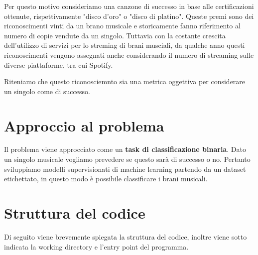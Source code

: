 Per questo motivo consideriamo una canzone di successo in base alle certificazioni ottenute, rispettivamente "disco d'oro" o "disco di platino". Queste premi sono dei riconoscimenti vinti da un brano musicale e storicamente fanno riferimento al numero di copie vendute da un singolo. Tuttavia con la costante crescita dell'utilizzo di servizi per lo streming di brani musciali, da qualche anno questi riconoscimenti vengono assegnati anche considerando il numero di streaming sulle diverse piattaforme, tra cui Spotify.

Riteniamo che questo riconosciemnto sia una metrica oggettiva per considerare un singolo come di successo.

\section{Approccio al problema}
Il problema viene approcciato come un \textbf{task di classificazione binaria}. Dato un singolo musicale vogliamo prevedere se questo sarà di successo o no. Pertanto sviluppiamo modelli supervisionati di machine learning partendo da un dataset etichettato, in questo modo è possibile classificare i brani musicali.


\section{Struttura del codice}
Di seguito viene brevemente spiegata la struttura del codice, inoltre viene sotto indicata la working directory e l'entry point del programma.

